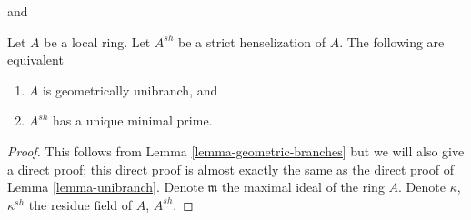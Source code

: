 \begin{lemma}
\label{lemma-geometrically-unibranch}
\begin{reference}
\cite[Lemma 2.2]{Etale-coverings} and
\cite[Chapter IV Proposition 18.8.15]{EGA4}
\end{reference}
Let $A$ be a local ring. Let $A^{sh}$ be a strict henselization of $A$.
The following are equivalent
\begin{enumerate}
\item $A$ is geometrically unibranch, and
\item $A^{sh}$ has a unique minimal prime.
\end{enumerate}
\end{lemma}

\begin{proof}
This follows from Lemma \ref{lemma-geometric-branches}
but we will also give a direct proof; this direct
proof is almost exactly the same as the direct proof of
Lemma \ref{lemma-unibranch}.
Denote $\mathfrak m$ the maximal ideal of the ring $A$.
Denote $\kappa$, $\kappa^{sh}$ the residue field of $A$, $A^{sh}$.


\end{proof}
